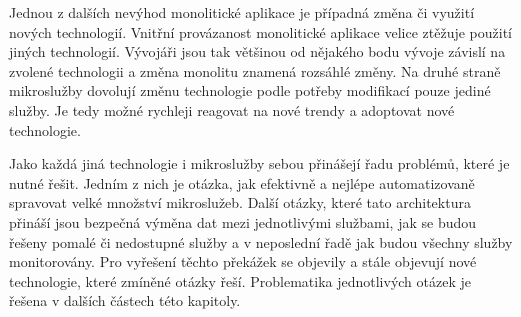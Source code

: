     Jednou z dalších nevýhod monolitické aplikace je případná změna či využití nových technologií. Vnitřní provázanost monolitické aplikace velice ztěžuje použití jiných technologií. Vývojáři jsou tak většinou od nějakého bodu vývoje závislí na zvolené technologii a změna monolitu znamená rozsáhlé změny. Na druhé straně mikroslužby dovolují změnu technologie podle potřeby modifikací pouze jediné služby. Je tedy možné rychleji reagovat na nové trendy a adoptovat nové technologie.\par
    Jako každá jiná technologie i mikroslužby sebou přinášejí řadu problémů, které je nutné řešit. Jedním z nich je otázka, jak efektivně a nejlépe automatizovaně spravovat velké množství mikroslužeb. Další otázky, které tato architektura přináší jsou bezpečná výměna dat mezi jednotlivými službami, jak se budou řešeny pomalé či nedostupné služby a v neposlední řadě jak budou všechny služby monitorovány. Pro vyřešení těchto překážek se objevily a stále objevují nové technologie, které zmíněné otázky řeší. Problematika jednotlivých otázek je řešena v dalších částech této kapitoly.

